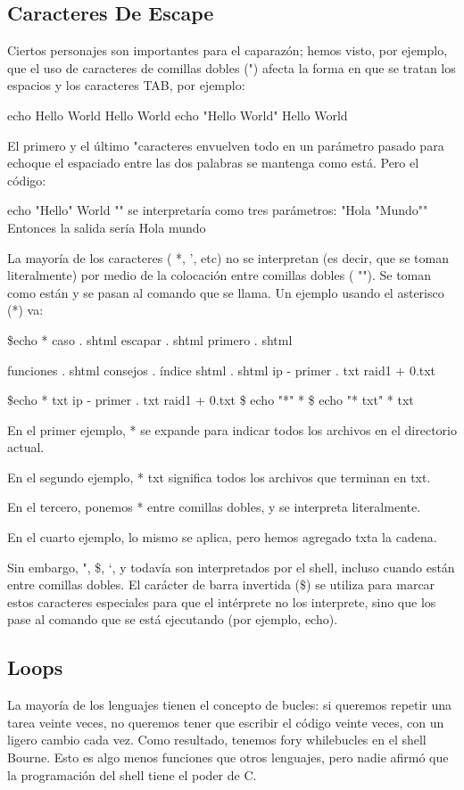 \documentclass{article}
\begin{document}
\begin{itemize}
\subsection{Caracteres De Escape}

Ciertos personajes son importantes para el caparazón; hemos visto, por ejemplo, que el uso de caracteres de comillas dobles (") afecta la forma en que se tratan los espacios y los caracteres TAB, por ejemplo:

 echo Hello World Hello World 
 echo "Hello World" Hello World
 
 El primero y el último "caracteres envuelven todo en un parámetro pasado para echoque el espaciado entre las dos palabras se mantenga como está. Pero el código:

echo "Hello" World ""  
se interpretaría como tres parámetros:
"Hola "Mundo""
Entonces la salida sería
Hola mundo    

La mayoría de los caracteres ( *, ', etc) no se interpretan (es decir, que se toman literalmente) por medio de la colocación entre comillas dobles ( ""). Se toman como están y se pasan al comando que se llama. Un ejemplo usando el asterisco (*) va:

\$echo * caso . shtml escapar . shtml primero . shtml


funciones . shtml consejos . índice shtml . shtml
ip - primer . txt raid1 + 0.txt 


\$echo * txt
ip - primer . txt raid1 + 0.txt 
\$ echo "*" * 
\$ echo "* txt" * txt


En el primer ejemplo, * se expande para indicar todos los archivos en el directorio actual. 


En el segundo ejemplo, * txt significa todos los archivos que terminan en txt. 


En el tercero, ponemos * entre comillas dobles, y se interpreta literalmente. 


En el cuarto ejemplo, lo mismo se aplica, pero hemos agregado txta la cadena.


Sin embargo, ", \$, `, y todavía son interpretados por el shell, incluso cuando están entre comillas dobles. 
El carácter de barra invertida ($\$$) se utiliza para marcar estos caracteres especiales para que el intérprete no los interprete, sino que los pase al comando que se está ejecutando (por ejemplo, echo). 

\subsection{Loops}
La mayoría de los lenguajes tienen el concepto de bucles: si queremos repetir una tarea veinte veces, no queremos tener que escribir el código veinte veces, con un ligero cambio cada vez. 
Como resultado, tenemos fory whilebucles en el shell Bourne. Esto es algo menos funciones que otros lenguajes, pero nadie afirmó que la programación del shell tiene el poder de C.


\end{itemize}
\end{document}
